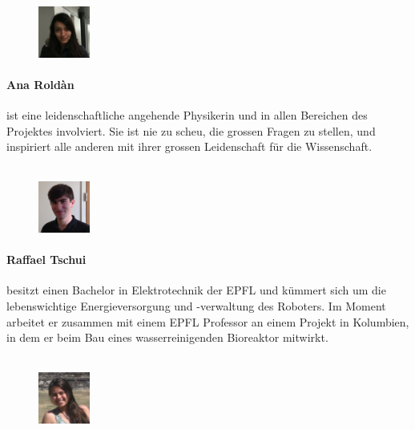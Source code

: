 \documentclass[a4paper,12pt]{article}
\begin{document}
\begin{figure}
    \centering
    \vspace{-13pt}
    \includegraphics[width=0.15\textwidth]{ana}
\end{figure}
\paragraph{Ana Roldàn} ist eine leidenschaftliche angehende Physikerin und in allen Bereichen des Projektes involviert. Sie ist nie zu scheu, die grossen Fragen zu stellen, und inspiriert alle anderen mit ihrer grossen Leidenschaft für die Wissenschaft.
\\ \\

\begin{figure}
     \centering
     \vspace{-13pt}
    \includegraphics[width=0.15\textwidth]{raf}
\end{figure} 
\paragraph{Raffael Tschui} besitzt einen Bachelor in Elektrotechnik der EPFL und kümmert sich um die lebenswichtige Energieversorgung und -verwaltung des Roboters. Im Moment arbeitet er zusammen mit einem EPFL Professor an einem Projekt in Kolumbien, in dem er beim Bau eines wasserreinigenden Bioreaktor mitwirkt.  
\\ \\

\begin{figure}
    \centering
    \vspace{-13pt}
    \includegraphics[width=0.15\textwidth]{pam}
\end{figure} 
\end{document}
